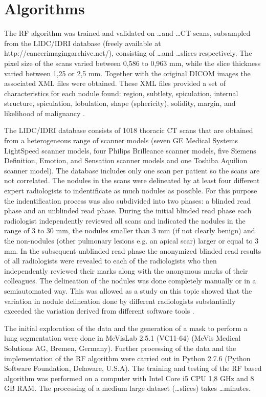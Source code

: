 \section{Algorithms}
The RF algorithm was trained and validated on \ldots and \ldots CT scans,
subsampled from the LIDC/IDRI database (freely available at
http://cancerimagingarchive.net/), consisting of \ldots and \ldots slices
respectively. The pixel size of the scans varied between 0,586 to 0,963 mm,
while the slice thickness varied between 1,25 or 2,5 mm. Together with the
original DICOM images the associated XML files were obtained. These XML files
provided a set of characteristics for each nodule found: region, subtlety,
spiculation, internal structure, spiculation, lobulation, shape (sphericity),
solidity, margin, and likelihood of malignancy \cite{lidcbase}.


The LIDC/IDRI database consists of 1018 thoracic CT scans that are obtained from
a heterogeneous range of scanner models (seven GE Medical Systems LightSpeed
scanner models, four Philips Brilleance scanner models, five Siemens Definition,
Emotion, and Sensation scanner models and one Toshiba Aquilion scanner model).
The database includes only one scan per patient so the scans are not correlated.
The nodules in the scans were delineated by at least four different expert
radiologists to indentificate as much nodules as possible. For this purpose the
indentification process was also subdivided into two phases: a blinded read
phase and an unblinded read phase. During the initial blinded read phase each
radiologist independently reviewed all scans and indicated the nodules in the
range of 3 to 30 mm, the nodules smaller than 3 mm (if not clearly benign) and
the non-nodules (other pulmonary lesions e.g. an apical scar) larger or equal to
3 mm. In the subsequent unblinded read phase the anonymized blinded read results
of all radiologists were revealed to each of the radiologists who then
independently reviewed their marks along with the anonymous marks of their
colleagues. The delineation of the nodules was done completely manually or in a
semiautomated way. This was allowed as a study on this topic showed that the
variation in nodule delineation done by different radiologists
substantially exceeded the variation derived from different software tools
\cite{lidcbase}.

The initial exploration of the data and the generation of a mask to perform a
lung segmentation were done in MeVisLab 2.5.1 (VC11-64) (MeVis Medical Solutions
AG, Bremen, Germany). Further processing of the data and the implementation of
the RF algorithm were carried out in Python 2.7.6 (Python Software Foundation,
Delaware, U.S.A).  The training and testing of the RF based algorithm was
performed on a computer with Intel Core i5 CPU 1,8 GHz and 8 GB RAM. The
processing of a medium large dataset (\ldots slices) takes \ldots minutes. %

